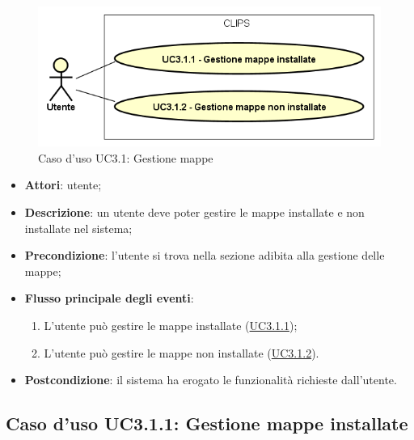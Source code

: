 \documentclass[../AnalisiDeiRequisiti.tex]{subfiles}
\begin{document}
\begin{figure}[H]
	\centering
	\includegraphics[scale=0.95, width=\textwidth]{img/UC3-1.png}
	\caption{Caso d'uso UC3.1: Gestione mappe}\label{fig:UC3.1} 
\end{figure}
\begin{itemize}
	\item \textbf{Attori}: utente;
	\item \textbf{Descrizione}: un utente deve poter gestire le mappe installate e non installate nel sistema; 
	\item \textbf{Precondizione}: l'utente si trova nella sezione adibita alla gestione delle mappe;
	
	\item \textbf{Flusso principale degli eventi}:
	\begin{enumerate}
		\item L'utente può gestire le mappe installate (\hyperlink{UC3.1.1}{UC3.1.1});
		\item L'utente può gestire le mappe non installate (\hyperlink{UC3.1.2}{UC3.1.2}).
		
	\end{enumerate}
	\item \textbf{Postcondizione}: il sistema ha erogato le funzionalità richieste dall'utente.
\end{itemize}
\hypertarget{UC3.1.1}{}
\subsection{Caso d'uso UC3.1.1: Gestione mappe installate}
\end{document}
